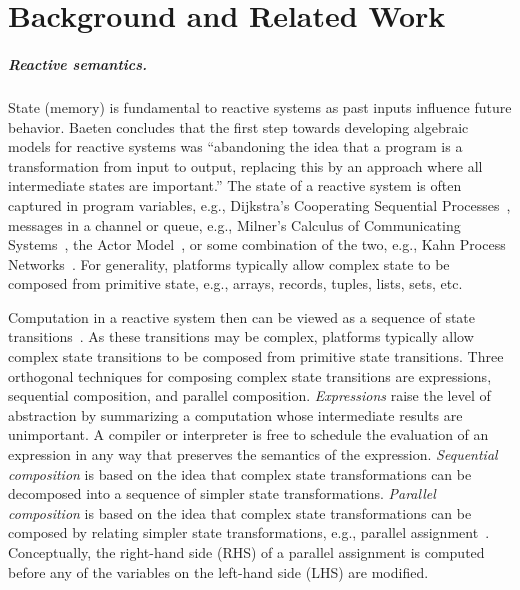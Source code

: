 \chapter{Background and Related Work \label{background}}

\paragraph{Reactive semantics.}
State (memory) is fundamental to reactive systems as past inputs influence future behavior.
Baeten concludes that the first step towards developing algebraic models for reactive systems was ``abandoning the idea that a program is a transformation from input to output, replacing this by an approach where all intermediate states are important\cite{baeten2005brief}.''
The state of a reactive system is often captured in program variables, e.g., Dijkstra's Cooperating Sequential Processes~\cite{dijkstra1965cooperating}, messages in a channel or queue, e.g.,  Milner's Calculus of Communicating Systems~\cite{milner1982calculus}, the Actor Model~\cite{agha1985actors}, or some combination of the two, e.g., Kahn Process Networks~\cite{kahn1974semantics}.
For generality, platforms typically allow complex state to be composed from primitive state, e.g., arrays, records, tuples, lists, sets, etc.

Computation in a reactive system then can be viewed as a sequence of state transitions~\cite{pnueli1981temporal}.
As these transitions may be complex, platforms typically allow complex state transitions to be composed from primitive state transitions.
Three orthogonal techniques for composing complex state transitions are expressions, sequential composition, and parallel composition.
\emph{Expressions} raise the level of abstraction by summarizing a computation whose intermediate results are unimportant.
A compiler or interpreter is free to schedule the evaluation of an expression in any way that preserves the semantics of the expression.
\emph{Sequential composition} is based on the idea that complex state transformations can be decomposed into a sequence of simpler state transformations.
\emph{Parallel composition} is based on the idea that complex state transformations can be composed by relating simpler state transformations, e.g., parallel assignment~\cite{barron1963main}.
Conceptually, the right-hand side (RHS) of a parallel assignment is computed before any of the variables on the left-hand side (LHS) are modified.

